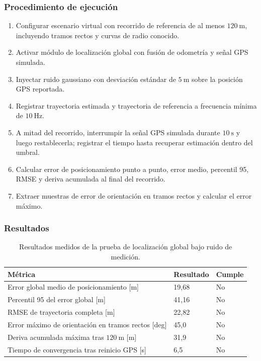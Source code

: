 \subsubsection{Procedimiento de ejecución}

\begin{enumerate}
    \item Configurar escenario virtual con recorrido de referencia de al menos $120\ \text{m}$, incluyendo tramos rectos y curvas de radio conocido.
    \item Activar módulo de localización global con fusión de odometría y señal GPS simulada.
    \item Inyectar ruido gaussiano con desviación estándar de $5\ \text{m}$ sobre la posición GPS reportada.
    \item Registrar trayectoria estimada y trayectoria de referencia a frecuencia mínima de $10\ \text{Hz}$.
    \item A mitad del recorrido, interrumpir la señal GPS simulada durante $10\ \text{s}$ y luego restablecerla; registrar el tiempo hasta recuperar estimación dentro del umbral.
    \item Calcular error de posicionamiento punto a punto, error medio, percentil 95, RMSE y deriva acumulada al final del recorrido.
    \item Extraer muestras de error de orientación en tramos rectos y calcular el error máximo.
\end{enumerate}

\subsubsection{Resultados}

\begin{table}[H]
\centering
\small
\begin{tabular}{p{8.8cm} p{2.2cm} p{2.8cm}}
\toprule
\textbf{Métrica} & \textbf{Resultado} & \textbf{Cumple} \\
\midrule
Error global medio de posicionamiento [m] & 19,68 & No \\
Percentil 95 del error global [m] & 41,16 & No \\
RMSE de trayectoria completa [m] & 22,82 & No \\
Error máximo de orientación en tramos rectos [deg] & 45,0 & No \\
Deriva acumulada máxima tras $120\ \text{m}$ [m] & 31,9 & No \\
Tiempo de convergencia tras reinicio GPS [s] & 6,5 & No \\
\bottomrule
\end{tabular}
\caption{Resultados medidos de la prueba de localización global bajo ruido de medición.}
\label{tab:resultados_prueba_localizacion}
\end{table}

